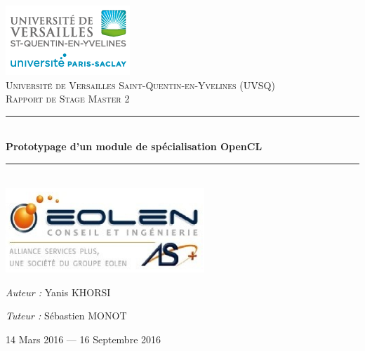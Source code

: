 \newcommand{\HRule}{\rule{\linewidth}{0.5mm}}

\begin{titlepage}
   \begin{sffamily}
      \begin{center}

         \includegraphics{./images/uvsq_logo.png}\\
         \textsc{\LARGE Université de Versailles Saint-Quentin-en-Yvelines (UVSQ)}\\[2cm]
         \textsc{\Large Rapport de Stage Master 2}\\[1.5cm]

         \HRule \\[0.4cm]
         {\huge \bfseries Prototypage d'un module de spécialisation OpenCL\\[0.4cm]}

         \HRule \\[1cm]
         \includegraphics[width=75mm]{./images/asplus_eolen_logo.png}\\[1cm]

         \begin{minipage}{0.4\textwidth}
            \begin{flushleft}
               \large \emph{Auteur :} Yanis \textsc{KHORSI}\\
            \end{flushleft}
         \end{minipage}
         \begin{minipage}{0.5\textwidth}
            \begin{flushright}
               \large \emph{Tuteur :} Sébastien \textsc{MONOT}\\
            \end{flushright}
         \end{minipage}

         \vfill

         {\large 14 Mars 2016 — 16 Septembre 2016}

      \end{center}
   \end{sffamily}
\end{titlepage}

